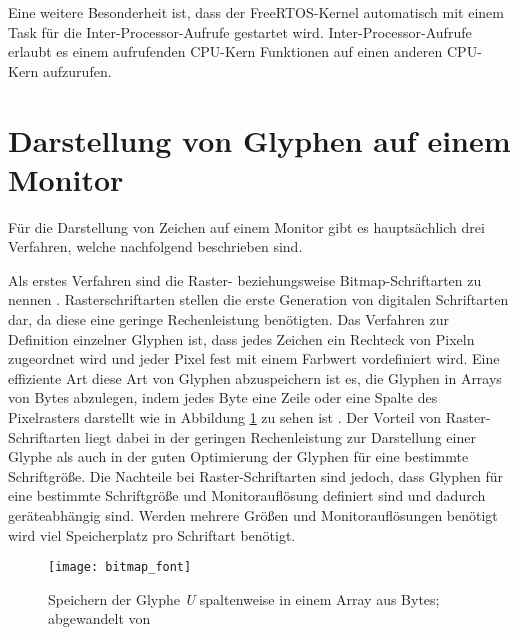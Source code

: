 Eine weitere Besonderheit ist, dass der FreeRTOS-Kernel automatisch mit einem Task für die Inter-Processor-Aufrufe gestartet wird. Inter-Processor-Aufrufe erlaubt es einem aufrufenden \acs{CPU}-Kern Funktionen auf einen anderen \acs{CPU}-Kern aufzurufen. \cites{espressifIPC}{espressifFreeRTOS}

\section{Darstellung von Glyphen auf einem Monitor}

Für die Darstellung von Zeichen auf einem Monitor gibt es hauptsächlich drei Verfahren, welche nachfolgend beschrieben sind.

Als erstes Verfahren sind die Raster- beziehungsweise Bitmap-Schriftarten zu nennen \cite{microsoftFonts}. Rasterschriftarten stellen die erste Generation von digitalen Schriftarten dar, da diese eine geringe Rechenleistung benötigten. Das Verfahren zur Definition einzelner Glyphen ist, dass jedes Zeichen ein Rechteck von Pixeln zugeordnet wird und jeder Pixel fest mit einem Farbwert vordefiniert wird. Eine effiziente Art diese Art von Glyphen abzuspeichern ist es, die Glyphen in Arrays von Bytes abzulegen, indem jedes Byte eine Zeile oder eine Spalte des Pixelrasters darstellt wie in Abbildung \ref{fig:bitmapFontArray} zu sehen ist \cite{sansonFont}. Der Vorteil von Raster-Schriftarten liegt dabei in der geringen Rechenleistung zur Darstellung einer Glyphe als auch in der guten Optimierung der Glyphen für eine bestimmte Schriftgröße. Die Nachteile bei Raster-Schriftarten sind jedoch, dass Glyphen für eine bestimmte Schriftgröße und Monitorauflösung definiert sind und dadurch geräteabhängig sind. Werden mehrere Größen und Monitorauflösungen benötigt wird viel Speicherplatz pro Schriftart benötigt. \cites{strizverFont}{microsoftFonts}

\begin{figure}[h]
    \centering
    \texttt{[image: bitmap\_font]}
    \caption{Speichern der Glyphe \textit{U} spaltenweise in einem Array aus Bytes; abgewandelt von \cite{sansonFont}}
    \label{fig:bitmapFontArray}
\end{figure}

